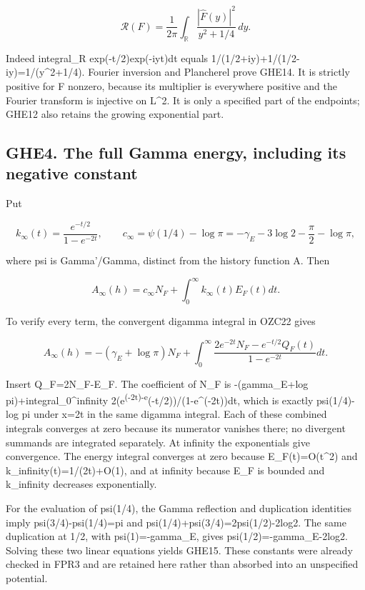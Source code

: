 \[
\boxed{\mathcal R(F)=\frac1{2\pi}\int_{\mathbb R}
\frac{|\widehat F(y)|^2}{y^2+1/4}\,dy.}
\tag{GHE14}
\]

Indeed integral\_R exp(-\textbar t\textbar/2)exp(-iyt)dt equals
1/(1/2+iy)+1/(1/2-iy)=1/(y\^{}2+1/4). Fourier inversion and Plancherel
prove GHE14. It is strictly positive for F nonzero, because its
multiplier is everywhere positive and the Fourier transform is injective
on L\^{}2. It is only a specified part of the endpoints; GHE12 also
retains the growing exponential part.

\subsection{GHE4. The full Gamma energy, including its negative
constant}\label{ghe4.-the-full-gamma-energy-including-its-negative-constant}

Put

\[
k_\infty(t)=\frac{e^{-t/2}}{1-e^{-2t}},\qquad
c_\infty=\psi(1/4)-\log\pi
=-\gamma_E-3\log2-\frac\pi2-\log\pi,
\tag{GHE15}
\]

where psi is Gamma'/Gamma, distinct from the history function A. Then

\[
\boxed{A_\infty(h)=c_\infty N_F+
\int_0^\infty k_\infty(t)E_F(t)dt.}
\tag{GHE16}
\]

To verify every term, the convergent digamma integral in OZC22 gives

\[
A_\infty(h)=-(\gamma_E+\log\pi)N_F+
\int_0^\infty
\frac{2e^{-2t}N_F-e^{-t/2}Q_F(t)}{1-e^{-2t}}dt.
\tag{GHE17}
\]

Insert Q\_F=2N\_F-E\_F. The coefficient of N\_F is -(gamma\_E+log
pi)+integral\_0\^{}infinity
2(e\textsuperscript{(-2t)-e}(-t/2))/(1-e\^{}(-2t))dt, which is exactly
psi(1/4)-log pi under x=2t in the same digamma integral. Each of these
combined integrals converges at zero because its numerator vanishes
there; no divergent summands are integrated separately. At infinity the
exponentials give convergence. The energy integral converges at zero
because E\_F(t)=O(t\^{}2) and k\_infinity(t)=1/(2t)+O(1), and at
infinity because E\_F is bounded and k\_infinity decreases
exponentially.

For the evaluation of psi(1/4), the Gamma reflection and duplication
identities imply psi(3/4)-psi(1/4)=pi and
psi(1/4)+psi(3/4)=2psi(1/2)-2log2. The same duplication at 1/2, with
psi(1)=-gamma\_E, gives psi(1/2)=-gamma\_E-2log2. Solving these two
linear equations yields GHE15. These constants were already checked in
FPR3 and are retained here rather than absorbed into an unspecified
potential.

